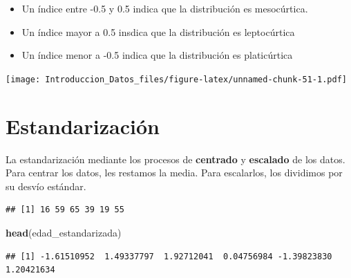 \documentclass[spanish,]{book}
\newenvironment{Shaded}{\begin{snugshade}}{\end{snugshade}}
\newcommand{\KeywordTok}[1]{\textcolor[rgb]{0.13,0.29,0.53}{\textbf{#1}}}
\newcommand{\StringTok}[1]{\textcolor[rgb]{0.31,0.60,0.02}{#1}}
\newcommand{\OperatorTok}[1]{\textcolor[rgb]{0.81,0.36,0.00}{\textbf{#1}}}
\newcommand{\NormalTok}[1]{#1}
\providecommand{\tightlist}{%
  \setlength{\itemsep}{0pt}\setlength{\parskip}{0pt}}
\begin{document}
\begin{itemize}
\tightlist
\item
  Un índice entre -0.5 y 0.5 indica que la distribución es mesocúrtica.
\item
  Un índice mayor a 0.5 insdica que la distribución es leptocúrtica
\item
  Un índice menor a -0.5 indica que la distribución es platicúrtica
\end{itemize}

\texttt{[image: Introduccion\_Datos\_files/figure-latex/unnamed-chunk-51-1.pdf]}

\section{Estandarización}\label{estandarizacion}

La estandarización mediante los procesos de \textbf{centrado} y
\textbf{escalado} de los datos. Para centrar los datos, les restamos la
media. Para escalarlos, los dividimos por su desvío estándar.

\begin{Shaded}
\end{Shaded}

\begin{verbatim}
## [1] 16 59 65 39 19 55
\end{verbatim}

\begin{Shaded}
\begin{Highlighting}[]
\KeywordTok{head}\NormalTok{(edad_estandarizada)}
\end{Highlighting}
\end{Shaded}

\begin{verbatim}
## [1] -1.61510952  1.49337797  1.92712041  0.04756984 -1.39823830  1.20421634
\end{verbatim}
\end{document}

